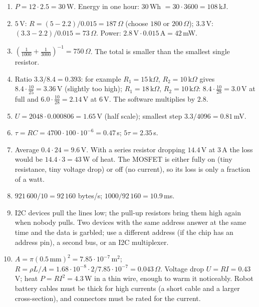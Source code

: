\begin{enumerate}[label=\textbf{\ansnum.\arabic*}]
  \item $P=12\cdot2.5=30$\,W. Energy in one hour: $30$\,Wh $=30\cdot3600=108$\,kJ.
  \item $5$\,V: $R=(5-2.2)/0.015=187\,\Omega$ (choose $180$ or $200\,\Omega$); $3.3$\,V: $(3.3-2.2)/0.015=73\,\Omega$. Power: $2.8\,\text{V}\cdot0.015\,\text{A}=42$\,mW.
  \item $\left(\frac1{1000}+\frac1{3000}\right)^{-1}=750\,\Omega$. The total is smaller than the smallest single resistor.
  \item Ratio $3.3/8.4=0.393$: for example $R_1=15\,\text{k}\Omega$, $R_2=10\,\text{k}\Omega$ gives $8.4\cdot\frac{10}{25}=3.36$\,V (slightly too high); $R_1=18\,\text{k}\Omega$, $R_2=10\,\text{k}\Omega$: $8.4\cdot\frac{10}{28}=3.0$\,V at full and $6.0\cdot\frac{10}{28}=2.14$\,V at $6$\,V. The software multiplies by $2.8$.
  \item $U=2048\cdot0.000806=1.65$\,V (half scale); smallest step $3.3/4096=0.81$\,mV.
  \item $\tau=RC=4700\cdot100\cdot10^{-6}=0.47$\,s; $5\tau=2.35$\,s.
  \item Average $0.4\cdot24=9.6$\,V. With a series resistor dropping $14.4$\,V at $3$\,A the loss would be $14.4\cdot3=43$\,W of heat. The MOSFET is either fully on (tiny resistance, tiny voltage drop) or off (no current), so its loss is only a fraction of a watt.
  \item $921\,600/10=92\,160$ bytes/s; $1000/92\,160=10.9$\,ms.
  \item I2C devices pull the lines low; the pull-up resistors bring them high again when nobody pulls. Two devices with the same address answer at the same time and the data is garbled; use a different address (if the chip has an address pin), a second bus, or an I2C multiplexer.
  \item[\textbf{\ansnum.10}] $A=\pi(0.5\,\text{mm})^2=7.85\cdot10^{-7}$\,m$^2$; $R=\rho L/A=1.68\cdot10^{-8}\cdot2/7.85\cdot10^{-7}=0.043\,\Omega$. Voltage drop $U=RI=0.43$\,V; heat $P=RI^2=4.3$\,W in a thin wire, enough to warm it noticeably. Robot battery cables must be thick for high currents (a short cable and a larger cross-section), and connectors must be rated for the current.
\end{enumerate}
